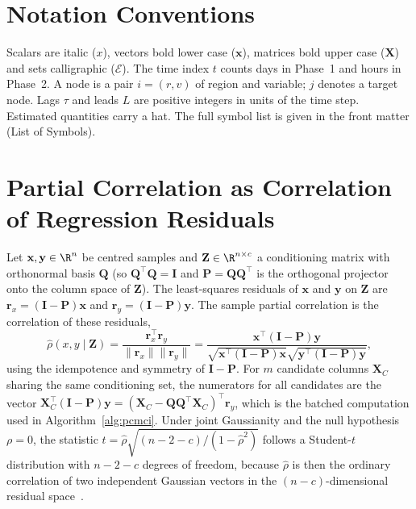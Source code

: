 \label{app:notation}

\section{Notation Conventions}
\label{app:conventions}

Scalars are italic ($x$), vectors bold lower case ($\mathbf{x}$), matrices bold upper case ($\mathbf{X}$) and sets calligraphic ($\mathcal{E}$). The time index $t$ counts days in Phase~1 and hours in Phase~2. A node is a pair $i=(r,v)$ of region and variable; $j$ denotes a target node. Lags $\tau$ and leads $L$ are positive integers in units of the time step. Estimated quantities carry a hat. The full symbol list is given in the front matter (List of Symbols).

\section{Partial Correlation as Correlation of Regression Residuals}
\label{app:parcorr}

Let $\mathbf{x},\mathbf{y}\in\R^{n}$ be centred samples and $\mathbf{Z}\in\R^{n\times c}$ a conditioning matrix with orthonormal basis $\mathbf{Q}$ (so $\mathbf{Q}^{\top}\mathbf{Q}=\mathbf{I}$ and $\mathbf{P}=\mathbf{Q}\mathbf{Q}^{\top}$ is the orthogonal projector onto the column space of $\mathbf{Z}$). The least-squares residuals of $\mathbf{x}$ and $\mathbf{y}$ on $\mathbf{Z}$ are $\mathbf{r}_x=(\mathbf{I}-\mathbf{P})\mathbf{x}$ and $\mathbf{r}_y=(\mathbf{I}-\mathbf{P})\mathbf{y}$. The sample partial correlation is the correlation of these residuals,
\begin{equation}
  \hat\rho(x,y\mid\mathbf{Z}) = \frac{\mathbf{r}_x^{\top}\mathbf{r}_y}{\lVert\mathbf{r}_x\rVert\lVert\mathbf{r}_y\rVert}
  = \frac{\mathbf{x}^{\top}(\mathbf{I}-\mathbf{P})\mathbf{y}}{\sqrt{\mathbf{x}^{\top}(\mathbf{I}-\mathbf{P})\mathbf{x}}\sqrt{\mathbf{y}^{\top}(\mathbf{I}-\mathbf{P})\mathbf{y}}},
\end{equation}
using the idempotence and symmetry of $\mathbf{I}-\mathbf{P}$. For $m$ candidate columns $\mathbf{X}_C$ sharing the same conditioning set, the numerators for all candidates are the vector $\mathbf{X}_C^{\top}(\mathbf{I}-\mathbf{P})\mathbf{y}=(\mathbf{X}_C-\mathbf{Q}\mathbf{Q}^{\top}\mathbf{X}_C)^{\top}\mathbf{r}_y$, which is the batched computation used in Algorithm~\ref{alg:pcmci}. Under joint Gaussianity and the null hypothesis $\rho=0$, the statistic $t=\hat\rho\sqrt{(n-2-c)/(1-\hat\rho^{2})}$ follows a Student-$t$ distribution with $n-2-c$ degrees of freedom, because $\hat\rho$ is then the ordinary correlation of two independent Gaussian vectors in the $(n-c)$-dimensional residual space~\cite{wilks2011statistical}.

